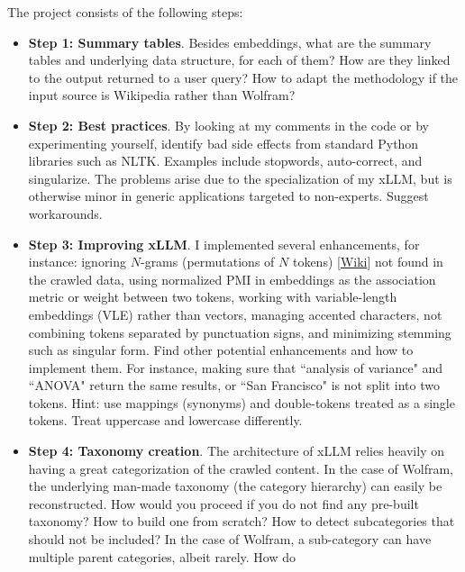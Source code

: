 \documentclass[oneside,10pt]{book}
\begin{document}
\noindent The project consists of the following steps:
\vspace{1ex}
\begin{itemize}
\item[] {\bf Step 1:  Summary tables}. Besides \textcolor{index}{embeddings}, what are the summary tables and underlying data structure, for each of them? How are they linked to 
 the output returned to a user query? How to adapt the methodology if the input source is Wikipedia rather than Wolfram?
 \vspace{1ex}
\item[] {\bf Step 2: Best practices}.  By looking at my comments in the code or by experimenting yourself, identify bad side effects from
 standard Python libraries such as \textcolor{index}{NLTK}. Examples include
 stopwords, auto-correct, and singularize. The problems arise due to the specialization of my xLLM, but is otherwise minor in generic
 applications targeted to non-experts. Suggest workarounds.
\vspace{1ex}
\item[] {\bf Step 3: Improving xLLM}.  I implemented several enhancements, for instance: ignoring \textcolor{index}{$N$-grams} (permutations of $N$ tokens) 
[\href{https://en.wikipedia.org/wiki/N-gram}{Wiki}] not found in the crawled data, 
 using normalized \textcolor{index}{PMI} in embeddings as the association metric or weight between two 
\textcolor{index}{tokens}, working with \textcolor{index}{variable-length embeddings} (VLE) rather than vectors, 
managing accented characters, not combining tokens separated by punctuation signs, and minimizing stemming such as singular form.  
Find other potential enhancements and how to implement them. For instance, making sure that ``analysis of variance" and ``ANOVA" return the same results, or ``San Francisco" is not split into two tokens. Hint: use mappings (synonyms) and double-tokens treated as a single tokens. Treat uppercase and lowercase differently.
\vspace{1ex}
\item[] {\bf Step 4: Taxonomy creation}.  The architecture of xLLM relies heavily on having a great categorization of the crawled content. In the case of Wolfram, 
 the underlying man-made taxonomy (the category hierarchy) can easily be reconstructed. How would you proceed if you do not find any pre-built taxonomy? How to build one from scratch? How to detect subcategories that should not be included? In the case of Wolfram, a sub-category can have multiple parent categories, albeit rarely. How do

\end{itemize}
\end{document}
